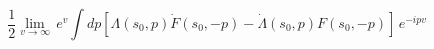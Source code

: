 \begin{equation*}
\frac{1}{2}\lim_{v\rightarrow \infty }\,e^{v}\int dp\left[ \Lambda \left(
s_{0},p\right) \dot{F}\left( s_{0},-p\right) -\dot{\Lambda} \left( s_{0},p\right)
F\left( s_{0},-p\right) \right] \,e^{-ipv}
\end{equation*}

